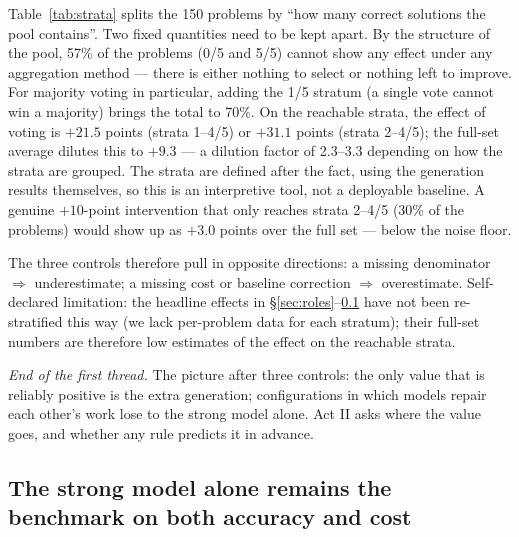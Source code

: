 \documentclass[11pt,a4paper]{article}
\begin{document}
Table~\ref{tab:strata} splits the 150 problems by ``how many correct solutions the pool contains''. Two fixed quantities need to be kept apart. By the structure of the pool, 57\% of the problems (0/5 and 5/5) cannot show any effect under any aggregation method --- there is either nothing to select or nothing left to improve. For majority voting in particular, adding the 1/5 stratum (a single vote cannot win a majority) brings the total to 70\%. On the reachable strata, the effect of voting is $+21.5$ points (strata 1--4/5) or $+31.1$ points (strata 2--4/5); the full-set average dilutes this to $+9.3$ --- a dilution factor of 2.3--3.3 depending on how the strata are grouped. The strata are defined after the fact, using the generation results themselves, so this is an interpretive tool, not a deployable baseline. A genuine $+10$-point intervention that only reaches strata 2--4/5 (30\% of the problems) would show up as $+3.0$ points over the full set --- below the noise floor.

The three controls therefore pull in opposite directions: a missing denominator $\Rightarrow$ underestimate; a missing cost or baseline correction $\Rightarrow$ overestimate. Self-declared limitation: the headline effects in \S\ref{sec:roles}--\ref{sec:baseline} have not been re-stratified this way (we lack per-problem data for each stratum); their full-set numbers are therefore low estimates of the effect on the reachable strata.

\emph{End of the first thread.} The picture after three controls: the only value that is reliably positive is the extra generation; configurations in which models repair each other's work lose to the strong model alone. Act II asks where the value goes, and whether any rule predicts it in advance.

\subsection{The strong model alone remains the benchmark on both accuracy and cost}\label{sec:baseline}
\end{document}
